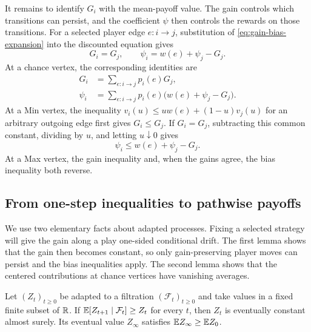 It remains to identify $G_i$ with the mean-payoff value. The gain
controls which transitions can persist, and the coefficient $\psi$
then controls the rewards on those transitions. For a selected player
edge $e:i\to j$, substitution of \eqref{eq:gain-bias-expansion} into
the discounted equation gives
\begin{equation}
               G_i=G_j,
               \qquad \psi_i=w(e)+\psi_j-G_j.
\label{eq:selected-gain-bias}
\end{equation}
At a chance vertex, the corresponding identities are
\begin{equation}
 \begin{split}
 G_i&=\sum_{e:i\to j}p_i(e)G_j,\\
 \psi_i&=\sum_{e:i\to j}p_i(e)\bigl(w(e)+\psi_j-G_j\bigr).
 \end{split}
\label{eq:chance-gain-bias}
\end{equation}
At a Min vertex, the inequality
$v_i(u)\le u w(e)+(1-u)v_j(u)$ for an arbitrary outgoing edge first
gives $G_i\le G_j$. If $G_i=G_j$, subtracting this common constant,
dividing by $u$, and letting $u\downarrow0$ gives
\begin{equation}
                  \psi_i\le w(e)+\psi_j-G_j.
\label{eq:min-gain-bias}
\end{equation}
At a Max vertex, the gain inequality and, when the gains agree, the
bias inequality both reverse.

\subsection{From one-step inequalities to pathwise payoffs}

We use two elementary facts about adapted processes. Fixing a selected
strategy will give the gain along a play one-sided conditional drift.
The first lemma shows that the gain then becomes constant, so only
gain-preserving player moves can persist and the bias inequalities
apply. The second lemma shows that the centered contributions at chance
vertices have vanishing averages.

\begin{lemma}
\label{lem:finite-submartingale}
Let $(Z_t)_{t\ge0}$ be adapted to a filtration $(\mathcal F_t)_{t\ge0}$
and take values in a fixed finite subset of $\mathbb R$. If
$\mathbb E[Z_{t+1}\mid\mathcal F_t]\ge Z_t$ for every $t$, then $Z_t$ is
eventually constant almost surely. Its eventual value $Z_\infty$
satisfies $\mathbb E Z_\infty\ge\mathbb E Z_0$.
\end{lemma}

